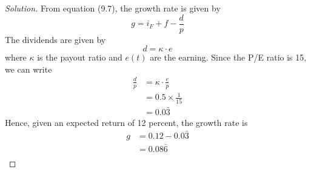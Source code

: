 \begin{proof}[Solution]
  From equation (9.7), the growth rate is given by
  \begin{equation*}
   g=i_{F}+f-\frac{d}{p}
  \end{equation*}
  The dividends are given by
  \begin{equation*}
   d=\kappa\cdot e
  \end{equation*}
  where $\kappa$ is the payout ratio and $e(t)$ are the earning. Since the P/E ratio is 15, we can write
  \begin{align*}
   \frac{d}{p}&=\kappa \cdot \frac{e}{p}\\
	      &=0.5 \times \frac{1}{15} \\
	      &=0.0\bar{3}
  \end{align*}
  Hence, given an expected return of 12 percent, the growth rate is
  \begin{align*}
   g&=0.12 - 0.0\bar{3}\\
    &=0.08\bar{6}\\
  \end{align*}



\end{proof}